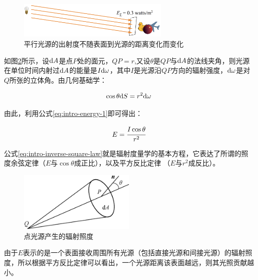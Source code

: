 \begin{figure}
\sidecaption
	\includegraphics[width=0.65\textwidth]{figures/intro/directional-irradiance}
	\caption{平行光源的出射度不随表面到光源的距离变化而变化}
	\label{f:intro-directional-irradiance}
\end{figure}

如图\ref{f:intro-inverse-square-law}所示，设${\rm d}A$是点$P$处的面元，$QP=r$,又设$\theta$是$QP$与${\rm d}A$的法线夹角，则光源在单位时间内射过${\rm d}A$的能量是$I{\rm d}\omega$，其中$I$是光源沿$QP$方向的辐射强度，${\rm d}\omega$是对$Q$所张的立体角。由几何基础学：

\begin{equation}
	\cos\theta {\rm d}S=r^{2}{\rm d}\omega
\end{equation}


\noindent 由此，利用公式\ref{eq:intro-energy-1}即可得出：

\begin{equation}\label{eq:intro-inverse-square-law}
	E= \cfrac{I\cos\theta}{r^{2}}
\end{equation}

公式\ref{eq:intro-inverse-square-law}就是辐射度量学的基本方程，它表达了所谓的照度余弦定律（$E$与$\cos\theta$成正比），以及平方反比定律 （$E$与$r^{2}$成反比）。

\begin{figure}
\sidecaption
	\includegraphics[width=0.5\textwidth]{figures/intro/inverse-square-law}
	\caption{点光源产生的辐射照度}
	\label{f:intro-inverse-square-law}
\end{figure}

由于$E$表示的是一个表面接收周围所有光源（包括直接光源和间接光源）的辐射照度，所以根据平方反比定律可以看出，一个光源距离该表面越远，则其光照贡献越小。









